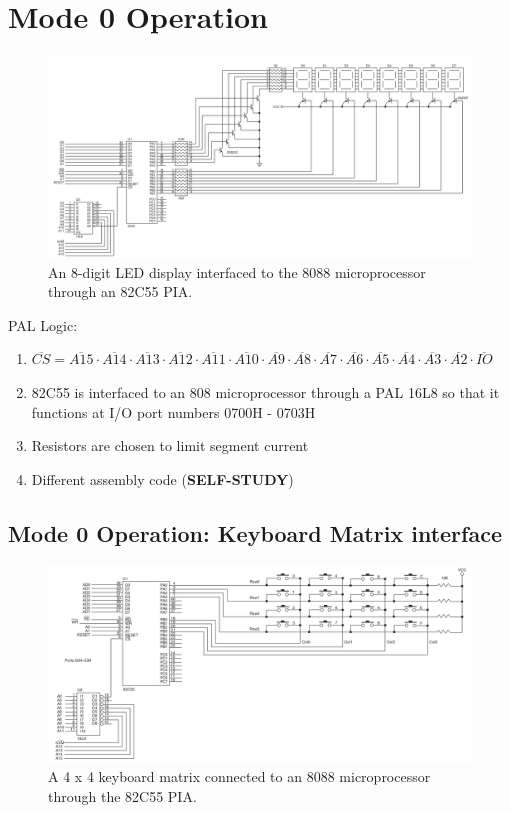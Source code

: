 \section{Mode 0 Operation}

\begin{figure}[h!]
  \centering
  \includegraphics[width = 1.2\textwidth]{./figures/Mode_0_op.png}
  \caption{An 8-digit LED display interfaced to the 8088 microprocessor through an 82C55 PIA.}
\end{figure}

PAL Logic:
\begin{enumerate}
  \item $\overline{CS} = \overline{A15} \cdot \overline{A14} \cdot \overline{A13} \cdot \overline{A12} \cdot \overline{A11} \cdot \overline{A10} \cdot \overline{A9} \cdot \overline{A8} \cdot \overline{A7} \cdot \overline{A6} \cdot \overline{A5} \cdot \overline{A4} \cdot \overline{A3} \cdot \overline{A2} \cdot \overline{IO}$
  \item 82C55 is interfaced to an 808 microprocessor through a PAL 16L8 so that it functions at I/O port numbers 0700H - 0703H
  \item Resistors are chosen to limit segment current
  \item Different assembly code (\textbf{SELF-STUDY})
\end{enumerate}

\subsection{Mode 0 Operation: Keyboard Matrix interface}

\begin{figure}[h!]
  \centering
  \includegraphics[width = 1.2\textwidth]{./figures/Mode_0_key.png}
  \caption{A 4 x 4 keyboard matrix connected to an 8088 microprocessor through the 82C55 PIA.}
\end{figure}


